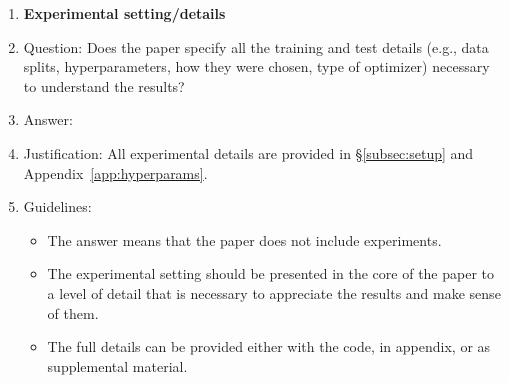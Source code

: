 \begin{enumerate}
\item {\bf Experimental setting/details}
    \item[] Question: Does the paper specify all the training and test details (e.g., data splits, hyperparameters, how they were chosen, type of optimizer) necessary to understand the results?
    \item[] Answer: \answerYes{}
    \item[] Justification: All experimental details are provided in \S\ref{subsec:setup} and Appendix~\ref{app:hyperparams}.
    \item[] Guidelines:
    \begin{itemize}
        \item The answer \answerNA{} means that the paper does not include experiments.
        \item The experimental setting should be presented in the core of the paper to a level of detail that is necessary to appreciate the results and make sense of them.
        \item The full details can be provided either with the code, in appendix, or as supplemental material.
    \end{itemize}


\end{enumerate}
